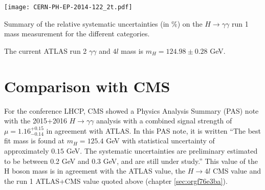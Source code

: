 \begin{table}
  \centering
  \texttt{[image: CERN-PH-EP-2014-122\_2t.pdf]}
  \caption{Summary of the relative systematic uncertainties (in $\%$) on the $H\rightarrow\gamma\gamma$ run 1 mass measurement for the different categories. \cite{CERN-PH-EP-2014-122} }
  \label{tab:HGam_results_MassSystRun1}
\end{table}


The current ATLAS run 2 $\gamma\gamma$ and $4l$ mass \cite{ATLAS-CONF-2017-046} is $m_H=124.98\pm0.28$ GeV.

\section{Comparison with CMS}
\label{sec:org2d182d7}

For the conference LHCP, CMS showed a Physics Analysis Summary (PAS) note with the 2015+2016 $H\rightarrow\gamma\gamma$ analysis \cite{CMS-PAS-HIG-16-040} with a combined signal strength of $\mu=1.16^{+0.15}_{-0.14}$ in agreement with ATLAS.
In this PAS note, it is written
``The best fit mass is found at $m_H=125.4$ GeV with statistical uncertainty of approximately $0.15$ GeV.
The systematic uncertainties are preliminary estimated to be between 0.2 GeV and 0.3 GeV, and are still under study.''
This value of the H boson mass is in agreement with the ATLAS value, the $H\rightarrow 4l$ CMS value \cite{CMS-PAS-HIG-16-041,CMS-HIG-16-041} and the run 1 ATLAS+CMS value \cite{CERN-PH-EP-2015-075} quoted above (chapter \ref{sec:orgf76e3ba}).
